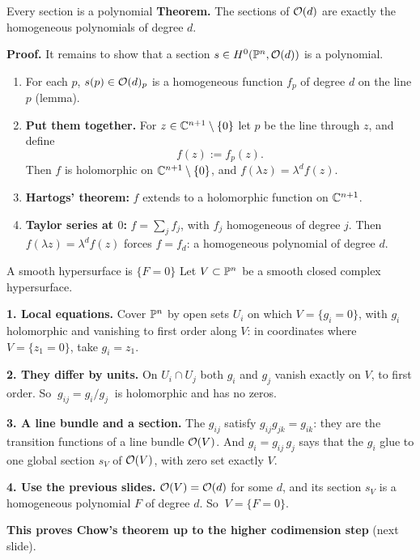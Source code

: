 \begin{frame}{Every section is a polynomial}
\label{fr:prov-od-4}
\textbf{Theorem.} The sections of \(\mathcal O(d)\) are exactly the homogeneous polynomials of degree \(d\).
\par\medskip
\textbf{Proof.} It remains to show that a section \(s\in H^0(\mathbb P^n,\mathcal O(d))\) is a polynomial.
\begin{enumerate}
\setlength{\itemsep}{6pt}
\item For each \(p\), \(s(p)\in\mathcal O(d)_p\) is a homogeneous function \(f_p\) of degree \(d\) on the line \(p\) (lemma).
\item \textbf{Put them together.} For \(z\in\mathbb C^{n+1}\setminus\{0\}\) let \(p\) be the line through \(z\), and define
\[
f(z):=f_p(z).
\]
Then \(f\) is holomorphic on \(\mathbb C^{n+1}\setminus\{0\}\), and \(f(\lambda z)=\lambda^df(z)\).
\item \textbf{Hartogs' theorem:} \(f\) extends to a holomorphic function on \(\mathbb C^{n+1}\).
\item \textbf{Taylor series at \(0\):} \(f=\sum_jf_j\), with \(f_j\) homogeneous of degree \(j\). Then \(f(\lambda z)=\lambda^df(z)\) forces \(f=f_d\): a homogeneous polynomial of degree \(d\).
\end{enumerate}
\end{frame}

\begin{frame}{A smooth hypersurface is \(\{F=0\}\)}
\label{fr:chow-3}
Let \(V\subset\mathbb P^n\) be a smooth closed complex hypersurface.
\par\smallskip
\textbf{1. Local equations.} Cover \(\mathbb P^n\) by open sets \(U_i\) on which \(V=\{g_i=0\}\), with \(g_i\) holomorphic and vanishing to first order along \(V\): in coordinates where \(V=\{z_1=0\}\), take \(g_i=z_1\).
\par\smallskip
\textbf{2. They differ by units.} On \(U_i\cap U_j\) both \(g_i\) and \(g_j\) vanish exactly on \(V\), to first order. So \(\ g_{ij}=g_i/g_j\ \) is holomorphic and has no zeros.
\par\smallskip
\textbf{3. A line bundle and a section.} The \(g_{ij}\) satisfy \(g_{ij}g_{jk}=g_{ik}\): they are the transition functions of a line bundle \(\mathcal O(V)\). And \(g_i=g_{ij}\,g_j\) says that the \(g_i\) glue to one global section \(s_V\) of \(\mathcal O(V)\), with zero set exactly \(V\).
\par\smallskip
\textbf{4. Use the previous slides.} \(\mathcal O(V)=\mathcal O(d)\) for some \(d\), and its section \(s_V\) is a homogeneous polynomial \(F\) of degree \(d\). So \(\ \boxed{V=\{F=0\}.}\)
\par\smallskip
\textbf{This proves Chow's theorem up to the higher codimension step} (next slide).
\end{frame}

